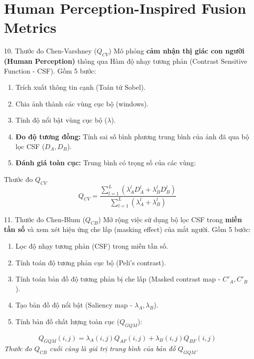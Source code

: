 \documentclass{beamer}
\begin{document}
\section{Human Perception-Inspired Fusion Metrics}

\begin{frame}{10. Thước đo Chen-Varshney ($Q_{CV}$)}
    Mô phỏng \textbf{cảm nhận thị giác con người (Human Perception)} thông qua Hàm độ nhạy tương phản (Contrast Sensitive Function - CSF). Gồm 5 bước:
    \begin{enumerate}
        \item Trích xuất thông tin cạnh (Toán tử Sobel).
        \item Chia ảnh thành các vùng cục bộ (windows).
        \item Tính độ nổi bật vùng cục bộ ($\lambda$).
        \item \textbf{Đo độ tương đồng:} Tính sai số bình phương trung bình của ảnh đã qua bộ lọc CSF ($D_A, D_B$).
        \item \textbf{Đánh giá toàn cục:} Trung bình có trọng số của các vùng:
    \end{enumerate}

    \begin{block}{Thước đo $Q_{CV}$}
    \begin{equation}
        Q_{CV} = \frac{\sum_{l=1}^L \left( \lambda_A^l D_A^l + \lambda_B^l D_B^l \right)}{\sum_{l=1}^L \left( \lambda_A^l + \lambda_B^l \right)}
    \end{equation}
    \end{block}
\end{frame}

\begin{frame}{11. Thước đo Chen-Blum ($Q_{CB}$)}
    Mở rộng việc sử dụng bộ lọc CSF trong \textbf{miền tần số} và xem xét hiệu ứng che lấp (masking effect) của mắt người. Gồm 5 bước:
    \begin{enumerate}
        \item Lọc độ nhạy tương phản (CSF) trong miền tần số.
        \item Tính toán độ tương phản cục bộ (Peli's contrast).
        \item Tính toán bản đồ độ tương phản bị che lấp (Masked contrast map - $C'_A, C'_B$).
        \item Tạo bản đồ độ nổi bật (Saliency map - $\lambda_A, \lambda_B$).
        \item Tính bản đồ chất lượng toàn cục ($Q_{GQM}$):
    \end{enumerate}

    \begin{equation}
        Q_{GQM}(i,j) = \lambda_A(i,j)Q_{AF}(i,j) + \lambda_B(i,j)Q_{BF}(i,j)
    \end{equation}
    \textit{Thước đo $Q_{CB}$ cuối cùng là giá trị trung bình của bản đồ $Q_{GQM}$.}
\end{frame}
\end{document}
